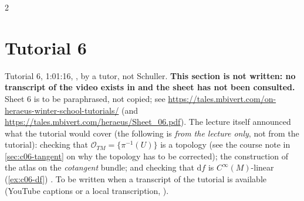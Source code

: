 \begin{paracol}{2}
\section{Tutorial 6}\label{sec:t06-1}

Tutorial 6, 1:01:16, , by a tutor, not Schuller. \textbf{This section is not written: no transcript of the video exists in  and the sheet has not been consulted.} Sheet 6 is to be paraphrased, not copied; see \url{https://tales.mbivert.com/on-heraeus-winter-school-tutorials/} (and \url{https://tales.mbivert.com/heraeus/Sheet_06.pdf}).
The lecture itself announced what the tutorial would cover (the following is \emph{from the lecture only}, not from the tutorial): checking that $\mathcal O_{TM}=\{\pi^{-1}(U)\}$ is a topology (see the course note in \cref{sec:c06-tangent} on why the topology has to be corrected); the construction of the atlas on the \emph{cotangent} bundle; and checking that $\mathrm df$ is $C^\infty(M)$-linear (\cref{ex:c06-df})
. To be written when a transcript of the tutorial is available (YouTube captions or a local transcription, ).


\end{paracol}
